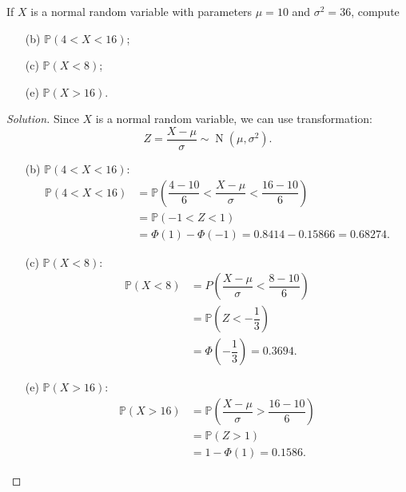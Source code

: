 \documentclass{article}[12pt]
\newenvironment{solution}
  {\renewcommand\qedsymbol{$\blacksquare$}\begin{proof}[Solution]}
  {\end{proof}}
\newenvironment{problem}[1]
  {\renewcommand\theinnercustomprblm{#1}\innercustomprblm}
  {\endinnercustomprblm}
\DeclareMathOperator{\Norm}{N}
\renewcommand{\P}{\mathbb{P}}
\begin{document}
\newpage
\begin{problem}{5.15(b, c, e)}\normalfont
If $X$ is a normal random variable with parameters $\mu = 10$ and $\sigma^{2} = 36$, compute
\begin{enumerate}%
    \item[(b)] $\P(4 < X < 16)$;
    \item[(c)] $\P(X < 8)$;
    \item[(e)] $\P(X > 16)$.
\end{enumerate}
\end{problem}
\begin{solution}
Since $X$ is a normal random variable, we can use transformation:
\begin{equation*}
    Z = \dfrac{X - \mu}{\sigma}\sim\Norm\left(\mu, \sigma^{2}\right).
\end{equation*}
\begin{enumerate}
    \item[(b)] $\P(4 < X < 16)$:
    \begin{align*}
        \P(4 < X < 16) &= \P\left(\dfrac{4 - 10}{6} < \dfrac{X - \mu}{\sigma} < \dfrac{16 - 10}{6} \right)
        \\
        &=\P(-1 < Z < 1)
        \\
        &=\Phi(1) - \Phi(-1) = 0.8414 - 0.15866 = 0.68274.
    \end{align*}
    
    \item[(c)] $\P(X < 8)$:
    \begin{align*}
        \P(X < 8) &= P\left(\dfrac{X -\mu}{\sigma} < \dfrac{8 - 10}{6}\right)
        \\
        &=\P\left(Z < -\dfrac{1}{3}\right)
        \\
        &=\Phi\left(-\dfrac{1}{3}\right) = 0.3694.
    \end{align*}
    
    \item[(e)] $\P(X > 16)$:
    \begin{align*}
        \P(X > 16) &= \P\left(\dfrac{X -\mu}{\sigma} > \dfrac{16 - 10}{6}\right)
        \\
        &=\P(Z > 1)
        \\
        &=1 - \Phi(1) = 0.1586.
    \end{align*}
\end{enumerate}
\end{solution}
\end{document}
